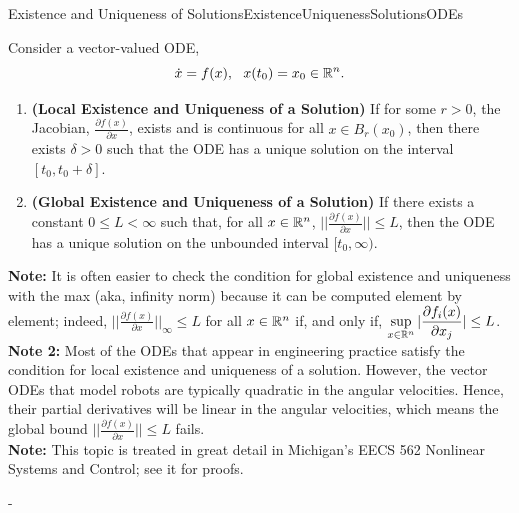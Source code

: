 \begin{propColor}{Existence and Uniqueness of Solutions}{ExistenceUniquenessSolutionsODEs}

Consider a vector-valued ODE,
\begin{equation}
    \dot{x} = f(x), ~~x(t_0) = x_0 \in \mathbb R^n.
\end{equation}
\begin{enumerate}
\renewcommand{\labelenumi}{(\alph{enumi})}
\setlength{\itemsep}{.2cm}
    \item \textbf{(Local Existence and Uniqueness of a Solution)} If for some $r>0$, the Jacobian, $\frac{\partial f(x)}{\partial x}$, exists and is continuous for all $x\in B_r(x_0)$, then there exists $\delta>0$ such that the ODE has a unique solution on the interval $[t_0, t_0+\delta]$.
    
      \item \textbf{(Global Existence and Uniqueness of a Solution)} If there exists a constant $0 \le L< \infty$ such that, for all $x \in \mathbb R^n$, $||\frac{\partial f(x)}{\partial x}||\le L$, then the ODE has a unique solution on the unbounded interval $[t_0, \infty)$.
      \end{enumerate} 
\bigskip
\textbf{Note:}  It is often easier to check the condition for global existence and uniqueness with the max (aka, infinity norm) because it can be computed element by element; indeed,  $||\frac{\partial f(x)}{\partial x}||_\infty \le L$ for all $x \in \mathbb R^n$ if, and only if, $\displaystyle \sup_{x\in \mathbb R^n} |\frac{\partial f_i(x)}{\partial x_j}|\le L$.\\

\textbf{Note 2:} Most of the ODEs that appear in engineering practice satisfy the condition for local existence and uniqueness of a solution. However, the vector ODEs that model robots are typically quadratic in the angular velocities. Hence, their partial derivatives will be linear in the angular velocities, which means the global bound $||\frac{\partial f(x)}{\partial x}||\le L$ fails.   \\

\textbf{Note:} This topic is treated in great detail in Michigan's EECS 562 Nonlinear Systems and Control; see it for proofs.
\end{propColor}

\bigskip-

